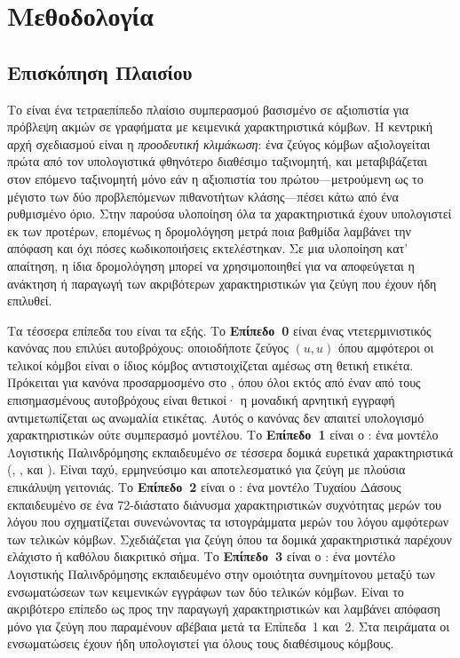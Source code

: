 

\chapter{Μεθοδολογία}
\label{ch:methodology}


\section{Επισκόπηση Πλαισίου}
\label{sec:framework-overview}

Το  είναι ένα τετραεπίπεδο πλαίσιο συμπερασμού βασισμένο σε αξιοπιστία
για πρόβλεψη ακμών σε γραφήματα με κειμενικά χαρακτηριστικά κόμβων.
Η κεντρική αρχή
σχεδιασμού είναι η \textit{προοδευτική κλιμάκωση}: ένα ζεύγος κόμβων αξιολογείται
πρώτα από τον υπολογιστικά φθηνότερο διαθέσιμο ταξινομητή, και μεταβιβάζεται στον
επόμενο ταξινομητή μόνο εάν η αξιοπιστία του πρώτου---μετρούμενη ως το μέγιστο των
δύο προβλεπόμενων πιθανοτήτων κλάσης---πέσει κάτω από ένα ρυθμισμένο όριο.
Στην παρούσα υλοποίηση όλα τα χαρακτηριστικά έχουν υπολογιστεί εκ των προτέρων, επομένως η
δρομολόγηση μετρά ποια βαθμίδα λαμβάνει την απόφαση και όχι πόσες κωδικοποιήσεις
 εκτελέστηκαν.
Σε μια υλοποίηση κατ' απαίτηση, η ίδια
δρομολόγηση μπορεί να χρησιμοποιηθεί για να αποφεύγεται η ανάκτηση ή παραγωγή των
ακριβότερων χαρακτηριστικών για ζεύγη που έχουν ήδη επιλυθεί.

Τα τέσσερα επίπεδα του  είναι τα εξής.
Το \textbf{Επίπεδο~0} είναι ένας
ντετερμινιστικός κανόνας που επιλύει αυτοβρόχους: οποιοδήποτε ζεύγος $(u, u)$ όπου
αμφότεροι οι τελικοί κόμβοι είναι ο ίδιος κόμβος αντιστοιχίζεται αμέσως στη θετική
ετικέτα.
Πρόκειται για κανόνα προσαρμοσμένο στο , όπου όλοι εκτός
από έναν από τους επισημασμένους αυτοβρόχους είναι θετικοί· η μοναδική αρνητική
εγγραφή αντιμετωπίζεται ως ανωμαλία ετικέτας.
Αυτός ο κανόνας δεν απαιτεί
υπολογισμό χαρακτηριστικών ούτε συμπερασμό μοντέλου.
Το \textbf{Επίπεδο~1} είναι ο
\texttt{}: ένα μοντέλο Λογιστικής Παλινδρόμησης εκπαιδευμένο σε
τέσσερα δομικά ευρετικά χαρακτηριστικά (, ,  και ). Είναι ταχύ,
ερμηνεύσιμο και αποτελεσματικό για ζεύγη με πλούσια επικάλυψη γειτονιάς.
Το \textbf{Επίπεδο~2} είναι ο \texttt{}: ένα μοντέλο Τυχαίου Δάσους
εκπαιδευμένο σε ένα 72-διάστατο διάνυσμα χαρακτηριστικών συχνότητας μερών του λόγου
που σχηματίζεται συνενώνοντας τα ιστογράμματα μερών του λόγου αμφότερων των τελικών
κόμβων.
Σχεδιάζεται για ζεύγη  όπου τα δομικά χαρακτηριστικά
παρέχουν ελάχιστο ή καθόλου διακριτικό σήμα.
Το \textbf{Επίπεδο~3} είναι ο
\texttt{}: ένα μοντέλο Λογιστικής Παλινδρόμησης εκπαιδευμένο
στην ομοιότητα συνημίτονου μεταξύ των ενσωματώσεων  των
κειμενικών εγγράφων των δύο τελικών κόμβων.
Είναι το ακριβότερο επίπεδο ως προς την παραγωγή χαρακτηριστικών και λαμβάνει
απόφαση μόνο για ζεύγη που παραμένουν αβέβαια μετά τα Επίπεδα~1 και~2.
Στα
πειράματα οι ενσωματώσεις έχουν ήδη υπολογιστεί για όλους τους διαθέσιμους
κόμβους.

